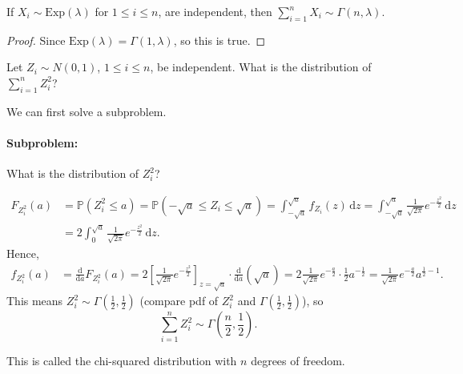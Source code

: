 \begin{corollary}
    If \(X_i \sim \mathrm{Exp}(\lambda ) \) for \(1 \le i \le n\), are independent, then \(\sum_{i=1}^n X_i \sim \Gamma (n, \lambda) \).   
\end{corollary}
\begin{proof}
    Since \(\mathrm{Exp}(\lambda) = \Gamma (1, \lambda)\), so this is true. 
\end{proof}

\begin{eg}
    Let \(Z_i \sim N(0, 1)\), \(1 \le i \le n\), be independent. What is the distribution of \(\sum_{i=1}^n Z_i^2 \)?   
\end{eg}

\begin{explanation}
    We can first solve a subproblem.
    \paragraph{Subproblem:} What is the distribution of \(Z_i^2\)?

    \begin{align*}
        F_{Z_i^2}(a) &= \mathbb{P} (Z_i^2 \le a) = \mathbb{P} (-\sqrt{a} \le Z_i \le \sqrt{a}) = \int _{-\sqrt{a} }^{\sqrt{a} } f_{Z_i}(z) \, \mathrm{d} z  = \int _{-\sqrt{a} }^{\sqrt{a} } \frac{1}{\sqrt{2 \pi } } e^{- \frac{z^2}{2}} \, \mathrm{d} z \\
        &= 2 \int _0^{\sqrt{a}} \frac{1}{\sqrt{2\pi } } e^{- \frac{z^2}{2}} \, \mathrm{d} z.   
    \end{align*} 
    Hence,
    \begin{align*}
        f_{Z_i^2}(a) &= \frac{\mathrm{d}}{\mathrm{d} a} F_{Z_i^2} (a) = 2 \left[ \frac{1}{\sqrt{2 \pi } } e^{- \frac{z^2}{2}} \right]_{z = \sqrt{a}} \cdot \frac{\mathrm{d}}{\mathrm{d}a} (\sqrt{a} ) = 2 \frac{1}{\sqrt{2 \pi }} e^{- \frac{a}{2}} \cdot \frac{1}{2} a^{-\frac{1}{2}} = \frac{1}{\sqrt{2 \pi }} e^{- \frac{a}{2}} a^{\frac{1}{2} - 1}.  
    \end{align*}
    This means \(Z_i^2 \sim \Gamma \left( \frac{1}{2}, \frac{1}{2} \right) \) (compare pdf of \(Z_i^2\) and \(\Gamma \left( \frac{1}{2}, \frac{1}{2} \right) \)), so 
    \[
        \sum_{i=1}^n Z_i^2 \sim \Gamma \left( \frac{n}{2}, \frac{1}{2} \right).  
    \] 
    \begin{remark}
        This is called the chi-squared distribution with \(n\) degrees of freedom. 
    \end{remark}
\end{explanation}


